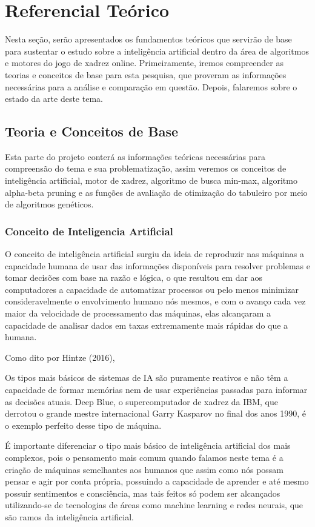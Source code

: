 \chapter{Referencial Teórico}
Nesta seção, serão apresentados os fundamentos teóricos que servirão de base para sustentar o estudo sobre a inteligência
artificial dentro da área de algoritmos e motores do jogo de xadrez online. Primeiramente, iremos compreender as teorias e
conceitos de base para esta pesquisa, que proveram as informações necessárias para a análise e comparação em questão.
Depois, falaremos sobre o estado da arte deste tema.

\section{Teoria e Conceitos de Base}
Esta parte do projeto conterá as informações teóricas necessárias para compreensão do tema e sua problematização,
assim veremos os conceitos de inteligência artificial, motor de xadrez, algoritmo de busca min-max,
algoritmo alpha-beta pruning e as funções de avaliação de otimização do tabuleiro por meio de algoritmos genéticos.

\subsection{Conceito de Inteligencia Artificial}
O conceito de inteligência artificial surgiu da ideia de reproduzir nas máquinas a capacidade humana de usar das informações
disponíveis para resolver problemas e tomar decisões com base na razão e lógica, o que resultou em dar aos computadores a
capacidade de automatizar processos ou pelo menos minimizar consideravelmente o envolvimento humano nós mesmos,
e com o avanço cada vez maior da velocidade de processamento das máquinas, elas alcançaram a capacidade de analisar dados
em taxas extremamente mais rápidas do que a humana.

Como dito por Hintze (2016),
\begin{citacao}
    Os tipos mais básicos de sistemas de IA são puramente reativos e não têm a capacidade de formar memórias nem de usar
    experiências passadas para informar as decisões atuais. Deep Blue, o supercomputador de xadrez da IBM, que derrotou o
    grande mestre internacional Garry Kasparov no final dos anos 1990, é o exemplo perfeito desse tipo de máquina.
    \cite[tradução nossa]{HINTZE}
\end{citacao}

É importante diferenciar o tipo mais básico de inteligência artificial dos mais complexos, pois o pensamento mais comum
quando falamos neste tema é a criação de máquinas semelhantes aos humanos que assim como nós possam pensar e agir por conta
própria, possuindo a capacidade de aprender e até mesmo possuir sentimentos e consciência, mas tais feitos só podem ser
alcançados utilizando-se de tecnologias de áreas como machine learning e redes neurais, que são ramos da inteligência
artificial.

